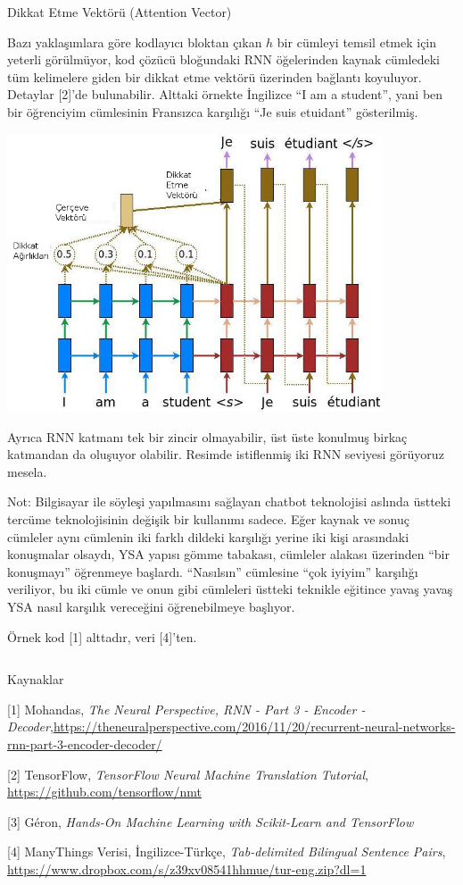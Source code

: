 \documentclass[12pt,fleqn]{article}\usepackage{../../common}
\begin{document}
Dikkat Etme Vektörü (Attention Vector)

Bazı yaklaşımlara göre kodlayıcı bloktan çıkan $h$ bir cümleyi temsil etmek
için yeterli görülmüyor, kod çözücü bloğundaki RNN öğelerinden kaynak
cümledeki tüm kelimelere giden bir dikkat etme vektörü üzerinden bağlantı
koyuluyor. Detaylar [2]'de bulunabilir. Alttaki örnekte İngilizce
``I am a student'', yani ben bir öğrenciyim cümlesinin Fransızca karşılığı
``Je suis etuidant'' gösterilmiş. 

\includegraphics[width=30em]{attention.jpg}

Ayrıca RNN katmanı tek bir zincir olmayabilir, üst üste konulmuş birkaç
katmandan da oluşuyor olabilir. Resimde istiflenmiş iki RNN seviyesi
görüyoruz mesela.

Not: Bilgisayar ile söyleşi yapılmasını sağlayan chatbot teknolojisi
aslında üstteki tercüme teknolojisinin değişik bir kullanımı sadece. Eğer
kaynak ve sonuç cümleler aynı cümlenin iki farklı dildeki karşılığı yerine
iki kişi arasındaki konuşmalar olsaydı, YSA yapısı gömme tabakası, cümleler
alakası üzerinden ``bir konuşmayı'' öğrenmeye başlardı. ``Nasılsın''
cümlesine ``çok iyiyim'' karşılığı veriliyor, bu iki cümle ve onun gibi
cümleleri üstteki teknikle eğitince yavaş yavaş YSA nasıl karşılık
vereceğini öğrenebilmeye başlıyor. 

Örnek kod [1] alttadır, veri [4]'ten.

\inputminted[fontsize=\footnotesize]{python}{translate.py}

Kaynaklar

[1] Mohandas, {\em The Neural Perspective, RNN - Part 3 - Encoder - Decoder},\url{https://theneuralperspective.com/2016/11/20/recurrent-neural-networks-rnn-part-3-encoder-decoder/}

[2] TensorFlow, {\em TensorFlow Neural Machine Translation Tutorial}, \url{https://github.com/tensorflow/nmt}

[3] Géron, {\em Hands-On Machine Learning with Scikit-Learn and TensorFlow}

[4] ManyThings Verisi, İngilizce-Türkçe, {\em Tab-delimited Bilingual Sentence Pairs}, \url{https://www.dropbox.com/s/z39xv08541hhmue/tur-eng.zip?dl=1}
\end{document}
